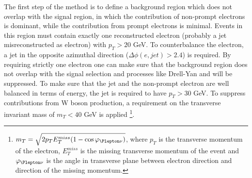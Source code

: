 The first step of the method is to define a background region which does not overlap with the signal region, in which the
contribution of non-prompt electrons is dominant, while the contribution from prompt electrons is minimal.
Events in this region must contain exactly one reconstructed electron (probably a jet misreconstructed as electron) with $p_T > 20$ GeV.
To counterbalance the electron, a jet in the opposite azimuthal direction ($\Delta \phi (e,jet) > 2.4$) is required.
By requiring strictly one electron one can make sure that the background region does not overlap with the signal selection and processes 
like Drell-Yan and \ttbar will be suppressed.
To make sure that the jet and the non-prompt electron are well balanced in terms of energy, the jet is
required to have $p_T > 30$ GeV.
To suppress contributions from W boson production, a requirement on the transverse invariant mass of 
$m_T < 40$ GeV is applied
\footnote{$m_T = \sqrt{2 p_T E_T^{miss} (1-\cos\varphi_{\Plepton\nu})}$, where
$p_T$ is the transverse momentum of the electron, $E_T^{miss}$ is the missing transverse momentum of the event
and $\varphi_{\Plepton\nu}$ is the angle in transverse plane between electron direction and direction of the missing momentum.}.

